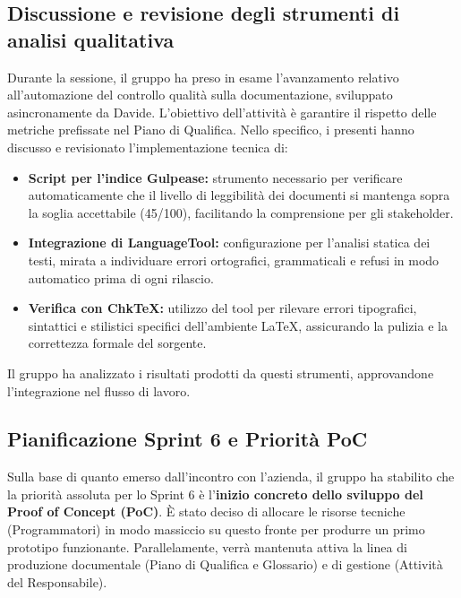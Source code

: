 \documentclass[a4paper, 11pt, oneside]{scrartcl}
\begin{document}
\subsection{Discussione e revisione degli strumenti di analisi qualitativa}
Durante la sessione, il gruppo ha preso in esame l'avanzamento relativo all'automazione del controllo qualità sulla documentazione, sviluppato asincronamente da Davide. L'obiettivo dell'attività è garantire il rispetto delle metriche prefissate nel Piano di Qualifica.
Nello specifico, i presenti hanno discusso e revisionato l'implementazione tecnica di:
\begin{itemize}
    \item \textbf{Script per l'indice Gulpease:} strumento necessario per verificare automaticamente che il livello di leggibilità dei documenti si mantenga sopra la soglia accettabile (45/100), facilitando la comprensione per gli stakeholder.
    \item \textbf{Integrazione di LanguageTool:} configurazione per l'analisi statica dei testi, mirata a individuare errori ortografici, grammaticali e refusi in modo automatico prima di ogni rilascio.
    \item \textbf{Verifica con ChkTeX:} utilizzo del tool per rilevare errori tipografici, sintattici e stilistici specifici dell'ambiente LaTeX, assicurando la pulizia e la correttezza formale del sorgente.
\end{itemize}
Il gruppo ha analizzato i risultati prodotti da questi strumenti, approvandone l'integrazione nel flusso di lavoro.

\subsection{Pianificazione Sprint 6 e Priorità PoC}
Sulla base di quanto emerso dall'incontro con l'azienda, il gruppo ha stabilito che la priorità assoluta per lo Sprint 6 è l'\textbf{inizio concreto dello sviluppo del Proof of Concept (PoC)}.
È stato deciso di allocare le risorse tecniche (Programmatori) in modo massiccio su questo fronte per produrre un primo prototipo funzionante. Parallelamente, verrà mantenuta attiva la linea di produzione documentale (Piano di Qualifica e Glossario) e di gestione (Attività del Responsabile).
\end{document}
